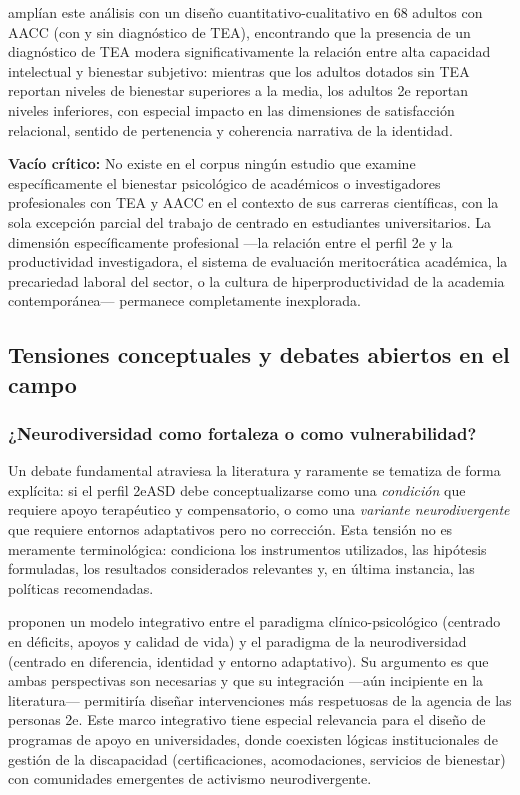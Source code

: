 \textcite{poirier2025} amplían este análisis con un diseño cuantitativo-cualitativo
en 68 adultos con AACC (con y sin diagnóstico de TEA), encontrando que la
presencia de un diagnóstico de TEA modera significativamente la relación entre
alta capacidad intelectual y bienestar subjetivo: mientras que los adultos
dotados sin TEA reportan niveles de bienestar superiores a la media, los adultos
2e reportan niveles inferiores, con especial impacto en las dimensiones de
satisfacción relacional, sentido de pertenencia y coherencia narrativa de la
identidad.

\textbf{Vacío crítico:} No existe en el corpus ningún estudio que examine
específicamente el bienestar psicológico de académicos o investigadores
profesionales con TEA y AACC en el contexto de sus carreras científicas,
con la sola excepción parcial del trabajo de \textcite{macleod2017} centrado
en estudiantes universitarios. La dimensión específicamente profesional
—la relación entre el perfil 2e y la productividad investigadora, el sistema
de evaluación meritocrática académica, la precariedad laboral del sector,
o la cultura de hiperproductividad de la academia contemporánea— permanece
completamente inexplorada.

\subsection{Tensiones conceptuales y debates abiertos en el campo}

\subsubsection{¿Neurodiversidad como fortaleza o como vulnerabilidad?}

Un debate fundamental atraviesa la literatura y raramente se tematiza de forma
explícita: si el perfil 2eASD debe conceptualizarse como una \textit{condición}
que requiere apoyo terapéutico y compensatorio, o como una \textit{variante
neurodivergente} que requiere entornos adaptativos pero no corrección. Esta
tensión no es meramente terminológica: condiciona los instrumentos utilizados,
las hipótesis formuladas, los resultados considerados relevantes y, en última
instancia, las políticas recomendadas.

\textcite{linares2026} proponen un modelo integrativo entre el paradigma
clínico-psicológico (centrado en déficits, apoyos y calidad de vida) y el
paradigma de la neurodiversidad (centrado en diferencia, identidad y entorno
adaptativo). Su argumento es que ambas perspectivas son necesarias y que su
integración —aún incipiente en la literatura— permitiría diseñar intervenciones
más respetuosas de la agencia de las personas 2e. Este marco integrativo
tiene especial relevancia para el diseño de programas de apoyo en universidades,
donde coexisten lógicas institucionales de gestión de la discapacidad
(certificaciones, acomodaciones, servicios de bienestar) con comunidades
emergentes de activismo neurodivergente.

